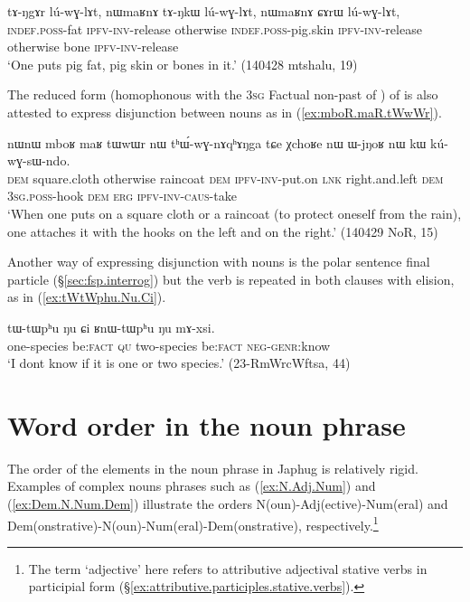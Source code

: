  \begin{exe}
\ex \label{ex:luwɣlAt.nWmaRnA}
 \gll  tɤ-ŋgɤr lú-wɣ-lɤt, nɯmaʁnɤ tɤ-ŋkɯ lú-wɣ-lɤt, nɯmaʁnɤ ɕɤrɯ lú-wɣ-lɤt, \\
 \textsc{indef}.\textsc{poss}-fat \textsc{ipfv}-\textsc{inv}-release otherwise  \textsc{indef}.\textsc{poss}-pig.skin  \textsc{ipfv}-\textsc{inv}-release otherwise bone \textsc{ipfv}-\textsc{inv}-release \\
\glt `One puts pig fat, pig skin or bones in it.' (140428 mtshalu, 19)
 \end{exe}

The reduced form  (homophonous with the \textsc{3sg} Factual non-past of ) of   is also attested to express disjunction between nouns as in (\ref{ex:mboR.maR.tWwWr}).

 \begin{exe}
\ex \label{ex:mboR.maR.tWwWr}
 \gll  nɯnɯ mboʁ maʁ tɯwɯr nɯ tʰɯ́-wɣ-nɤqʰɤŋga tɕe χchoʁe nɯ ɯ-jŋoʁ nɯ kɯ kú-wɣ-sɯ-ndo. \\
 \textsc{dem} square.cloth otherwise raincoat \textsc{dem} \textsc{ipfv}-\textsc{inv}-put.on \textsc{lnk} right.and.left \textsc{dem} \textsc{3sg}.\textsc{poss}-hook \textsc{dem} \textsc{erg} \textsc{ipfv}-\textsc{inv}-\textsc{caus}-take \\
 \glt `When one puts on a square cloth or a raincoat (to protect oneself from the rain), one attaches it with the hooks on the left and on the right.' (140429 NoR, 15)
  \end{exe}

Another way of expressing disjunction with nouns is the polar sentence final particle  (§\ref{sec:fsp.interrog}) but the verb is repeated in both clauses with elision, as in (\ref{ex:tWtWphu.Nu.Ci}).

 \begin{exe}
\ex \label{ex:tWtWphu.Nu.Ci}
 \gll tɯ-tɯpʰu ŋu ɕi ʁnɯ-tɯpʰu ŋu mɤ-xsi. \\
 one-species be:\textsc{fact} \textsc{qu} two-species be:\textsc{fact}  \textsc{neg}-\textsc{genr}:know \\
\glt `I dont know if it is one or two species.' (23-RmWrcWftsa, 44)
 \end{exe}
 
\section{Word order in the noun phrase} \label{sec:noun.phrases.word.order}
The  order of the elements in the noun phrase in Japhug is relatively rigid.  Examples of complex nouns phrases such as (\ref{ex:N.Adj.Num}) and (\ref{ex:Dem.N.Num.Dem}) illustrate the orders N(oun)-Adj(ective)-Num(eral) and Dem(onstrative)-N(oun)-Num(eral)-Dem(onstrative), respectively.\footnote{The term `adjective' here refers to attributive adjectival stative verbs in participial form (§\ref{ex:attributive.participles.stative.verbs}). } 

